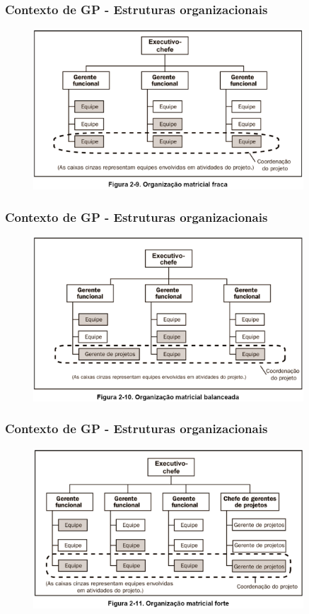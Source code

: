     \begin{frame}
 \frametitle{Contexto de GP - Estruturas organizacionais}
 \begin{figure}
  \centering
  \includegraphics[width = 0.9\textwidth]{figs/fig8.png}
 \end{figure}
\end{frame}

    \begin{frame}
 \frametitle{Contexto de GP - Estruturas organizacionais}
 \begin{figure}
  \centering
  \includegraphics[width = 0.9\textwidth]{figs/fig9.png}
 \end{figure}
\end{frame}

    \begin{frame}
 \frametitle{Contexto de GP - Estruturas organizacionais}
 \begin{figure}
  \centering
  \includegraphics[width = 0.9\textwidth]{figs/fig10.png}
 \end{figure}
\end{frame}

